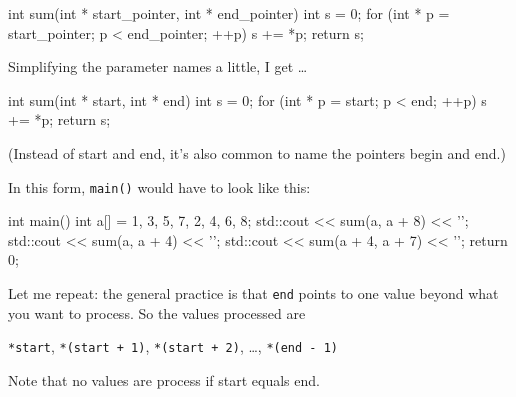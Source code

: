 \begin{consolethree}[escapeinside=||]
int sum(int * start_pointer, int * end_pointer)
{
    int s = 0;
    for (int * p = start_pointer;
         p < end_pointer; ++p)
    {
        s += *p;
    }
    return s;
}
\end{consolethree}

Simplifying the parameter names a little, I get \ldots{}

\begin{consolethree}[escapeinside=||]
int sum(int * start, int * end)
{
    int s = 0;
    for (int * p = start; p < end; ++p)
    {
        s += *p;
    }
    return s;
}
\end{consolethree}

(Instead of start and end, it's also common to name the pointers begin and end.)

In this form, \texttt{main()} would have to look like this:

\begin{consolethree}[escapeinside=||]
int main()
{
    int a[] = {1, 3, 5, 7, 2, 4, 6, 8};
    std::cout << sum(a, a + 8) << '\n';
    std::cout << sum(a, a + 4) << '\n';
    std::cout << sum(a + 4, a + 7) << '\n';
    return 0;
}
\end{consolethree}

Let me repeat: the general practice is that \texttt{end} points to one
value beyond what you want to process. So the values processed are

\texttt{*start}, \texttt{*(start + 1)}, \texttt{*(start + 2)}, \ldots,
\texttt{*(end - 1)}

Note that no values are process if start equals end.








